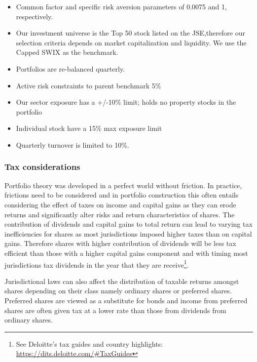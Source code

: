 \documentclass[10pt,preprint, authoryear]{elsarticle}
\numberwithin{equation}{section}
\numberwithin{figure}{section}
\numberwithin{table}{section}
\def\tightlist{} %
\let\rmarkdownfootnote\footnote%
\def\footnote{\protect\rmarkdownfootnote}
\begin{document}
\begin{itemize}
\tightlist
\item
  Common factor and specific risk aversion parameters of 0.0075 and 1,
  respectively.
\item
  Our investment universe is the Top 50 stock listed on the
  JSE,therefore our selection criteria depends on market capitalization
  and liquidity. We use the Capped SWIX as the benchmark.
\item
  Portfolios are re-balanced quarterly.
\item
  Active risk constraints to parent benchmark 5\%
\item
  Our sector exposure has a +/-10\% limit; holds no property stocks in
  the portfolio
\item
  Individual stock have a 15\% max exposure limit
\item
  Quarterly turnover is limited to 10\%.\\
\end{itemize}

\hypertarget{tax-considerations}{%
\subsubsection*{Tax considerations}\label{tax-considerations}}

Portfolio theory was developed in a perfect world without friction. In
practice, frictions need to be considered and in portfolio construction
this often entails considering the effect of taxes on income and capital
gains as they can erode returns and significantly alter risks and return
characteristics of shares. The contribution of dividends and capital
gains to total return can lead to varying tax inefficiencies for shares
as most jurisdictions imposed higher taxes than on capital gains.
Therefore shares with higher contribution of dividends will be less tax
efficient than those with a higher capital gains component and with
timing most jurisdictions tax dividends in the year that they are
receive\footnote{See Deloitte's tax guides and country highlights:
  \url{https://dits.deloitte.com/\#TaxGuides}}.

Jurisdictional laws can also affect the distribution of taxable returns
amongst shares depending on their class namely ordinary shares or
preferred shares. Preferred shares are viewed as a substitute for bonds
and income from preferred shares are often given tax at a lower rate
than those from dividends from ordinary shares.
\end{document}
